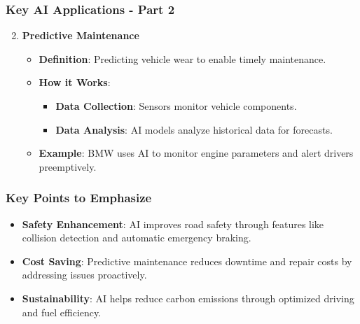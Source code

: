 \documentclass{beamer}
\begin{document}
\begin{frame}[fragile]
    \frametitle{Key AI Applications - Part 2}
    \begin{enumerate}
        \setcounter{enumi}{1} %
        \item \textbf{Predictive Maintenance}
            \begin{itemize}
                \item \textbf{Definition}: Predicting vehicle wear to enable timely maintenance.
                \item \textbf{How it Works}: 
                    \begin{itemize}
                        \item \textbf{Data Collection}: Sensors monitor vehicle components.
                        \item \textbf{Data Analysis}: AI models analyze historical data for forecasts.
                    \end{itemize}
                \item \textbf{Example}: BMW uses AI to monitor engine parameters and alert drivers preemptively.
            \end{itemize}
    \end{enumerate}
\end{frame}

\begin{frame}[fragile]
    \frametitle{Key Points to Emphasize}
    \begin{itemize}
        \item \textbf{Safety Enhancement}: AI improves road safety through features like collision detection and automatic emergency braking.
        \item \textbf{Cost Saving}: Predictive maintenance reduces downtime and repair costs by addressing issues proactively.
        \item \textbf{Sustainability}: AI helps reduce carbon emissions through optimized driving and fuel efficiency.
    \end{itemize}
\end{frame}
\end{document}

